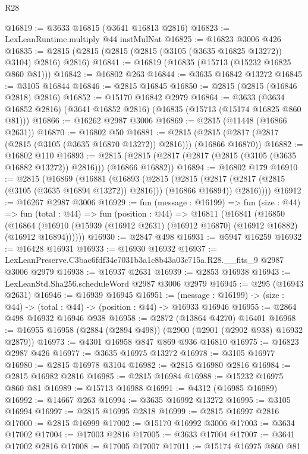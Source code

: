 \begin{lexlean}{R28}
\begin{coremodule}
@16819 := @3633 @16815 (@3641 @16813 @2816)
@16823 := LexLeanRuntime.multiply @44 instMulNat
@16825 := @16823 @3006 @426
@16835 := @2815 (@2815 (@2815 (@2815 (@3105 (@3635 @16825 @13272)) @3104) @2816) @2816)
@16841 := @16819 (@16835 (@15713 (@15232 @16825 @860 @81)))
@16842 := @16802 @263
@16844 := @3635 @16842 @13272
@16845 := @3105 @16844
@16846 := @2815 @16845
@16850 := @2815 (@2815 (@16846 @2818) @2816)
@16852 := @15170 @16842 @2979
@16864 := @3633 (@3634 @16852 @2816) (@3641 @16852 @2816) (@16835 (@15713 (@15174 @16825 @860 @81)))
@16866 := @16262 @2987 @3006
@16869 := @2815 (@11448 (@16866 @2631))
@16870 := @16802 @50
@16881 := @2815 (@2815 (@2817 (@2817 (@2815 (@3105 (@3635 @16870 @13272)) @2816))) (@16866 @16870))
@16882 := @16802 @110
@16893 := @2815 (@2815 (@2817 (@2817 (@2815 (@3105 (@3635 @16882 @13272)) @2816))) (@16866 @16882))
@16894 := @16802 @179
@16910 := @2815
    (@16869
      (@16881
        (@16893
          (@2815
            (@2815 (@2817 (@2817 (@2815 (@3105 (@3635 @16894 @13272)) @2816))) (@16866 @16894))
            @2816))))
@16912 := @16267 @2987 @3006
@16929 := fun (message : @16199) =>
  fun (size : @44) =>
  fun (total : @44) =>
  fun (position : @44) =>
  @16811
    (@16841
      (@16850
        (@16864 (@16910 (@15939 (@16912 @2631) (@16912 @16870) (@16912 @16882) (@16912 @16894))))))
@16930 := @2847 @498
@16931 := @5947 @16259
@16932 := @16428 @16931
@16933 := @16930 @16932
@16937 := LexLeanPreserve.C3bac6fdf34e7031b3a1c8b43a03c715a.R28.__fits_9 @2987 @3006 @2979
@16938 := @16937 @2631
@16939 := @2853 @16938
@16943 := LexLeanStd.Sha256.scheduleWord @2987 @3006 @2979
@16945 := @295 (@16943 @2631)
@16946 := @16939 @16945
@16951 := (message : @16199) -> (size : @44) -> (total : @44) -> (position : @44) -> @16933 @16946
@16955 := @2864 @498 @16932 @16946 @938
@16958 := @2872 (@13864 @4270) @16401
@16968 := @16955 @16958 (@2884 (@2894 @498)) (@2900 (@2901 (@2902 @938) @16932 @2879))
@16973 := @4301 @16958 @847 @869 @936 @16810
@16975 := @16823 @2987 @426
@16977 := @3635 @16975 @13272
@16978 := @3105 @16977
@16980 := @2815 @16978 @3104
@16982 := @2815 @16980 @2816
@16984 := @2815 @16982 @2816
@16985 := @2815 @16984
@16988 := @15232 @16975 @860 @81
@16989 := @15713 @16988
@16991 := @4312 (@16985 @16989)
@16992 := @14667 @263
@16994 := @3635 @16992 @13272
@16995 := @3105 @16994
@16997 := @2815 @16995 @2818
@16999 := @2815 @16997 @2816
@17000 := @2815 @16999
@17002 := @15170 @16992 @3006
@17003 := @3634 @17002
@17004 := @17003 @2816
@17005 := @3633 @17004
@17007 := @3641 @17002 @2816
@17008 := @17005 @17007
@17011 := @15174 @16975 @860 @81

\end{coremodule}
\end{lexlean}
